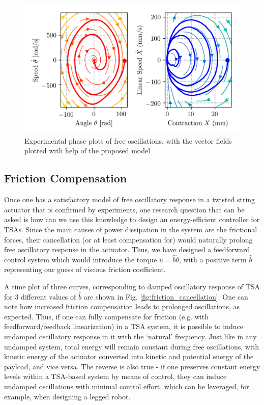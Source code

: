 \begin{figure}
		\centering
		\includegraphics[trim= 0.0cm 1.0cm 0.0cm 0.0cm,width=1.0\columnwidth]{pics/plots/phase_space_experiment.png}
		\vspace*{-2mm} 
		\caption{Experimental phase plots of free oscillations, with the vector fields plotted with help of the proposed model}
 		\label{fig:phase_plots_exp}
\end{figure}

\subsection{Friction Compensation}
Once one has a satisfactory model of free oscillatory response in a twisted string actuator that is confirmed by experiments, one research question that can be asked is how can we use this knowledge to design an energy-efficient controller for TSAs. Since the main causes of power dissipation in the system are the frictional forces, their cancellation (or at least compensation for) would naturally prolong free oscillatory response in the actuator. Thus, we have designed a feedforward control system which would introduce the torque $u = \hat{b}\dot{\theta}$, with a positive term $\hat{b}$ representing our guess of viscous friction coefficient. 

A time plot of three curves, corresponding to damped oscillatory response of TSA for 3 different values of $\hat{b}$ are shown in Fig. \ref{fig:friction_cancellation}. One can note how increased friction compensation leads to prolonged   oscillations, as expected. Thus, if one can fully compensate for friction (e.g. with feedforward/feedback linearization) in a TSA system, it is possible to induce undamped oscillatory response in it with the `natural' frequency. Just like in any undamped system, total energy will remain constant during free oscillations, with kinetic energy of the actuator converted into kinetic and potential energy of the payload, and vice versa. The reverse is also true - if one preserves constant energy levels within a TSA-based system by means of control, they can induce undamped oscillations with minimal control effort, which can be leveraged, for example, when designing a legged robot. 

